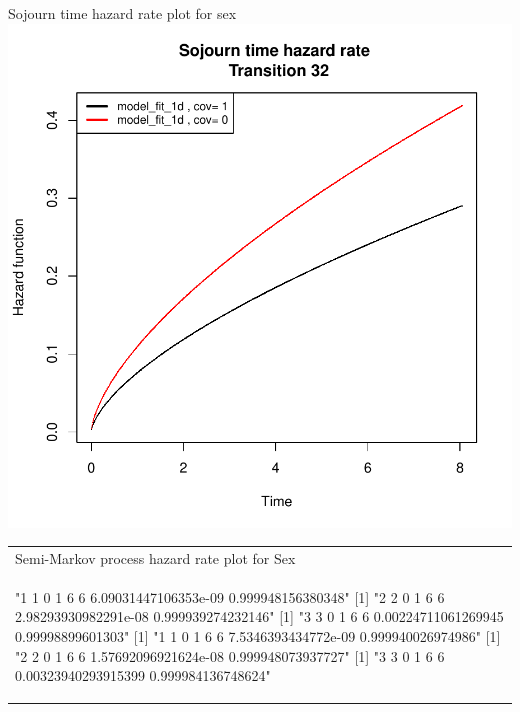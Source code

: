 \documentclass[11pt,a4paper]{article}
\begin{document}
\begin{enumerate}
\begin{minipage}{0.45\textwidth}
Sojourn time hazard rate plot for sex\\
\includegraphics{SemiMarkov_Paper-020}
\end{minipage}%
\begin{minipage}{0.45\textwidth}
\begin{tabular}{|p{\textwidth}}
Semi-Markov process hazard rate plot for Sex\\
\begin{Schunk}
\begin{Soutput}
[1] "1 1 0 1 6 6 6.09031447106353e-09 0.999948156380348"
[1] "2 2 0 1 6 6 2.98293930982291e-08 0.999939274232146"
[1] "3 3 0 1 6 6 0.00224711061269945 0.99998899601303"
[1] "1 1 0 1 6 6 7.5346393434772e-09 0.999940026974986"
[1] "2 2 0 1 6 6 1.57692096921624e-08 0.999948073937727"
[1] "3 3 0 1 6 6 0.00323940293915399 0.999984136748624"
\end{Soutput}
\end{Schunk}

\end{tabular}
\end{minipage}
\end{enumerate}
\end{document}
